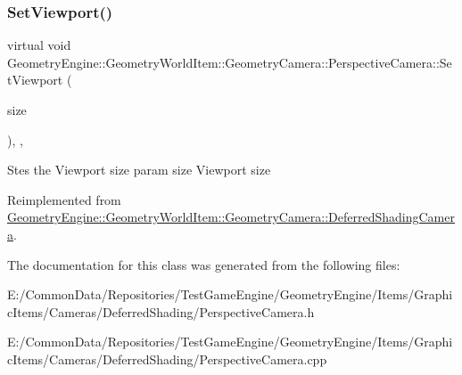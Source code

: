 \subsubsection{\texorpdfstring{SetViewport()}{SetViewport()}}
{\footnotesize\ttfamily virtual void Geometry\+Engine\+::\+Geometry\+World\+Item\+::\+Geometry\+Camera\+::\+Perspective\+Camera\+::\+Set\+Viewport (\begin{DoxyParamCaption}\item[{const Q\+Vector4D \&}]{size }\end{DoxyParamCaption})\hspace{0.3cm}{\ttfamily [inline]}, {\ttfamily [override]}, {\ttfamily [virtual]}}

Stes the Viewport size param size Viewport size 

Reimplemented from \mbox{\hyperlink{class_geometry_engine_1_1_geometry_world_item_1_1_geometry_camera_1_1_deferred_shading_camera_a33cb7d45b61f5d4414951bafb3f6a342}{Geometry\+Engine\+::\+Geometry\+World\+Item\+::\+Geometry\+Camera\+::\+Deferred\+Shading\+Camera}}.



The documentation for this class was generated from the following files\+:\begin{DoxyCompactItemize}
\item 
E\+:/\+Common\+Data/\+Repositories/\+Test\+Game\+Engine/\+Geometry\+Engine/\+Items/\+Graphic\+Items/\+Cameras/\+Deferred\+Shading/Perspective\+Camera.\+h\item 
E\+:/\+Common\+Data/\+Repositories/\+Test\+Game\+Engine/\+Geometry\+Engine/\+Items/\+Graphic\+Items/\+Cameras/\+Deferred\+Shading/Perspective\+Camera.\+cpp\end{DoxyCompactItemize}
